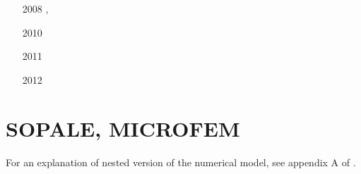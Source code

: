 \begin{small}
\begin{itemize}
\item[2008] \textcite{chlg08}, \textcite{chgu08}
\item[2010] \textcite{qula10}
\item[2011] \textcite{chss11}
\item[2012] \textcite{chbu12}
\end{itemize}
\end{small}

\section{SOPALE, MICROFEM}
For an explanation of nested version of the numerical model, see appendix A of \textcite{webe18}.


